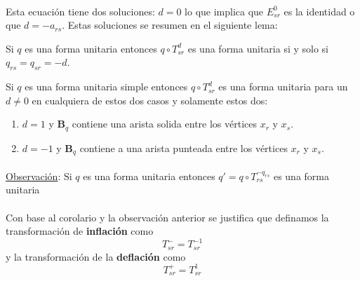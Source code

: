 \paragraph{}
Esta ecuación tiene dos soluciones: $d = 0$ lo que implica que $E_{sr}^{0}$ es la identidad o que $d = -a_{rs}$. Estas soluciones se resumen en el siguiente lema:
\begin{lemma}
Si $q$ es una forma unitaria entonces $q \circ T_{sr}^{d}$ es una forma unitaria si y solo si $q_{rs} = q_{sr} = -d$.
\label{lema:2.1}
\end{lemma}
\begin{corollary}
Si $q$ es una forma unitaria simple entonces $q \circ T_{sr}^{d}$ es una forma unitaria para un $d \neq 0$ en cualquiera de estos dos casos y solamente estos dos:
\label{corolario:2.2}
\end{corollary}
\begin{enumerate}
    \item $d = 1$ y $\textbf{B}_{q}$ contiene una arista solida entre los vértices $x_{r}$ y $x_{s}$.
    \item $d = -1$ y $\textbf{B}_{q}$ contiene a una arista punteada entre los vértices $x_{r}$ y $x_{s}$.
\end{enumerate}
\paragraph{}
\ul{Observación}: Si $q$ es una forma unitaria entonces $q' = q \circ T_{rs}^{-q_{rs}}$ es una forma unitaria
\paragraph{}
Con base al corolario y la observación anterior se justifica que definamos la transformación de \textbf{inflación} como
\begin{equation*}
    T_{sr}^{-} = T_{sr}^{-1}
\end{equation*}
y la transformación de la \textbf{deflación} como
\begin{equation*}
    T_{sr}^{+} = T_{sr}^{1}
\end{equation*}


